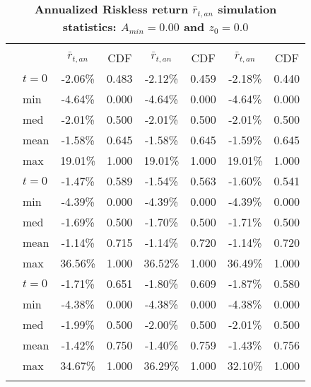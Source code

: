 \documentclass[letterpaper,12pt]{article}
\theoremstyle{definition}
\begin{document}
\begin{spacing}{1.5}
  \begin{table}[htbp]\centering\captionsetup{width=4.6in}
  \caption{\label{TabRiskl_A0}\textbf{Annualized Riskless return $\bar{r}_{t,an}$ simulation statistics: $A_{min}=0.00$ and $z_0=0.0$}}
    \begin{threeparttable}
    \begin{tabular}{>{\small}c >{\small}l| >{\small}c >{\small}c| >{\small}c >{\small}c| >{\small}c >{\small}c}
      \hline\hline
      & & \multicolumn{2}{c}{$k_{2,0}=0.11$} & \multicolumn{2}{c}{$k_{2,0}=0.14$} & \multicolumn{2}{c}{$k_{2,0}=0.17$} \\ \cline{3-8}
      & & $\bar{r}_{t,an}$ & CDF & $\bar{r}_{t,an}$ & CDF & $\bar{r}_{t,an}$ & CDF \\
      \hline
      \multirow{5}{*}{$\bar{H}=0.00$}
      & $t=0$ & -2.06\% & 0.483 & -2.12\% & 0.459 & -2.18\% & 0.440 \\
      & min & -4.64\% & 0.000 & -4.64\% & 0.000 & -4.64\% & 0.000 \\
      & med & -2.01\% & 0.500 & -2.01\% & 0.500 & -2.01\% & 0.500 \\
      & mean & -1.58\% & 0.645 & -1.58\% & 0.645 & -1.59\% & 0.645 \\
      & max & 19.01\% & 1.000 & 19.01\% & 1.000 & 19.01\% & 1.000 \\
      \hline
      \multirow{5}{*}{$\bar{H}=0.05$}
      & $t=0$ & -1.47\% & 0.589 & -1.54\% & 0.563 & -1.60\% & 0.541 \\
      & min & -4.39\% & 0.000 & -4.39\% & 0.000 & -4.39\% & 0.000 \\
      & med & -1.69\% & 0.500 & -1.70\% & 0.500 & -1.71\% & 0.500 \\
      & mean & -1.14\% & 0.715 & -1.14\% & 0.720 & -1.14\% & 0.720 \\
      & max & 36.56\% & 1.000 & 36.52\% & 1.000 & 36.49\% & 1.000 \\
      \hline
      \multirow{5}{*}{$\bar{H}=0.11$}
      & $t=0$ & -1.71\% & 0.651 & -1.80\% & 0.609 & -1.87\% & 0.580 \\
      & min & -4.38\% & 0.000 & -4.38\% & 0.000 & -4.38\% & 0.000 \\
      & med & -1.99\% & 0.500 & -2.00\% & 0.500 & -2.01\% & 0.500 \\
      & mean & -1.42\% & 0.750 & -1.40\% & 0.759 & -1.43\% & 0.756 \\
      & max & 34.67\% & 1.000 & 36.29\% & 1.000 & 32.10\% & 1.000 \\
      \hline
      \multirow{5}{*}{$\bar{H}=0.17$}

\end{tabular}
\end{threeparttable}
\end{table}
\end{spacing}
\end{document}
